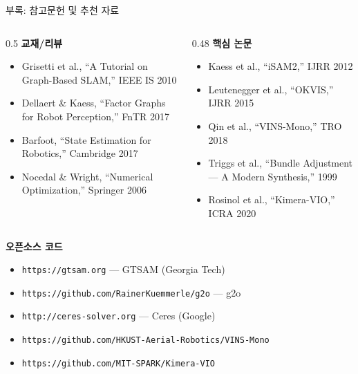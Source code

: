 \begin{frame}{부록: 참고문헌 및 추천 자료}
  \begin{columns}[T]
    \begin{column}{0.5\textwidth}
      \textbf{교재/리뷰}
      \begin{itemize}
        \item Grisetti et al., ``A Tutorial on Graph-Based SLAM,'' IEEE IS 2010
        \item Dellaert \& Kaess, ``Factor Graphs for Robot Perception,'' FnTR 2017
        \item Barfoot, ``State Estimation for Robotics,'' Cambridge 2017
        \item Nocedal \& Wright, ``Numerical Optimization,'' Springer 2006
      \end{itemize}
    \end{column}
    \begin{column}{0.48\textwidth}
      \textbf{핵심 논문}
      \begin{itemize}
        \item Kaess et al., ``iSAM2,'' IJRR 2012
        \item Leutenegger et al., ``OKVIS,'' IJRR 2015
        \item Qin et al., ``VINS-Mono,'' TRO 2018
        \item Triggs et al., ``Bundle Adjustment — A Modern Synthesis,'' 1999
        \item Rosinol et al., ``Kimera-VIO,'' ICRA 2020
      \end{itemize}
    \end{column}
  \end{columns}
  \pause
  \vspace{0.4em}
  \textbf{오픈소스 코드}
  \begin{itemize}
    \item \texttt{https://gtsam.org} — GTSAM (Georgia Tech)
    \item \texttt{https://github.com/RainerKuemmerle/g2o} — g2o
    \item \texttt{http://ceres-solver.org} — Ceres (Google)
    \item \texttt{https://github.com/HKUST-Aerial-Robotics/VINS-Mono}
    \item \texttt{https://github.com/MIT-SPARK/Kimera-VIO}
  \end{itemize}
\end{frame}


